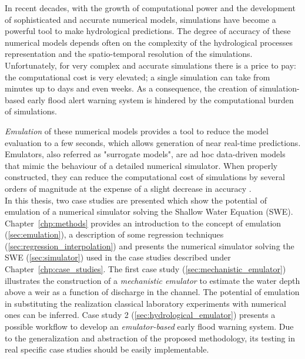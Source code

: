 In recent decades, with the growth of computational power and the development of sophisticated and accurate numerical models, simulations have become a powerful tool to make hydrological predictions. 
The degree of accuracy of these numerical models depends often on the complexity of the hydrological processes representation and the spatio-temporal resolution of the simulations. Unfortunately, for very complex and accurate simulations there is a price to pay: the computational cost is very elevated; a single simulation can take from  minutes up to days and even weeks. As a consequence, the creation of simulation-based early flood alert warning system is hindered by the computational burden of simulations. 

\emph{Emulation} of these numerical models provides a tool to reduce the model evaluation to a few seconds, which allows generation of near real-time predictions.
Emulators, also referred as "surrogate models", are ad hoc data-driven models that mimic the behaviour of a detailed numerical simulator. When properly constructed, they can reduce the computational cost of simulations by several orders of magnitude at the expense of a slight decrease in accuracy \autocite{carbajal_appraisal_2016}.\\

In this thesis, two case studies are presented which show the potential of emulation of a numerical simulator solving the Shallow Water Equation (SWE). 
Chapter~\ref{chp:methods} provides an introduction to the concept of emulation (\ref{sec:emulation}), a description of some regression techniques (\ref{sec:regression_interpolation}) and presents the numerical simulator solving the SWE (\ref{sec:simulator}) used in the case studies described under Chapter~\ref{chp:case_studies}.
The first case study (\ref{sec:mechanistic_emulator}) illustrates the construction of a \emph{mechanistic emulator} to estimate the water depth above a weir as a function of discharge in the channel.
The potential of emulation in substituting the realization classical laboratory experiments with numerical ones can be inferred.
Case study 2 (\ref{sec:hydrological_emulator}) presents a possible workflow to develop an \emph{emulator-based} early flood warning system. 
Due to the generalization and abstraction of the proposed methodology, its testing in real specific case studies should be easily implementable.\\



